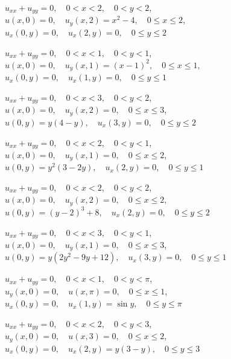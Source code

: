 \begin{exerciselist}
\item\label{exer:12.3.7}$u_{xx}+u_{yy}=0,\quad 0<x<2,\quad  0<y<2$,\\
$u(x,0)=0,\quad u_y(x,2)=x^2-4,\quad 0\le x\le 2$,\\
$u_x(0,y)=0,\quad u_x(2,y)=0,\quad 0\le y\le 2$


\item\label{exer:12.3.8}$u_{xx}+u_{yy}=0,\quad 0<x<1,\quad  0<y<1$,\\
$u(x,0)=0,\quad u_y(x,1)=(x-1)^2,\quad 0\le x\le 1$,\\
$u_x(0,y)=0,\quad u_x(1,y)=0,\quad 0\le y\le 1$

\item\label{exer:12.3.9}\Cex
$u_{xx}+u_{yy}=0,\quad 0<x<3,\quad  0<y<2$,\\
$u(x,0)=0,\quad u_y(x,2)=0,\quad 0\le x\le 3$,\\
$u(0,y)=y(4-y),\quad u_x(3,y)=0,\quad 0\le y\le 2$

\item\label{exer:12.3.10}$u_{xx}+u_{yy}=0,\quad 0<x<2,\quad  0<y<1$,\\
$u(x,0)=0,\quad u_y(x,1)=0,\quad 0\le x\le 2$,\\
$u(0,y)=y^2(3-2y),\quad u_x(2,y)=0,\quad 0\le y\le 1$

\item\label{exer:12.3.11}$u_{xx}+u_{yy}=0,\quad 0<x<2,\quad  0<y<2$,\\
$u(x,0)=0,\quad u_y(x,2)=0,\quad 0\le x\le 2$,\\
$u(0,y)=(y-2)^3+8,\quad u_x(2,y)=0,\quad 0\le y\le 2$

\item\label{exer:12.3.12}$u_{xx}+u_{yy}=0,\quad 0<x<3,\quad  0<y<1$,\\
$u(x,0)=0,\quad u_y(x,1)=0,\quad 0\le x\le 3$,\\
$u(0,y)=y(2y^2-9y+12),\quad u_x(3,y)=0,\quad 0\le y\le 1$

\item\label{exer:12.3.13}\Cex
$u_{xx}+u_{yy}=0,\quad 0<x<1,\quad  0<y<\pi$,\\
$u_y(x,0)=0,\quad u(x,\pi)=0,\quad 0\le x\le 1$,\\
$u_x(0,y)=0,\quad u_x(1,y)=\sin y,\quad 0\le y\le \pi$

\item\label{exer:12.3.14}$u_{xx}+u_{yy}=0,\quad 0<x<2,\quad  0<y<3$,\\
$u_y(x,0)=0,\quad u(x,3)=0,\quad 0\le x\le 2$,\\
$u_x(0,y)=0,\quad u_x(2,y)=y(3-y),\quad 0\le y\le 3$


\end{exerciselist}
